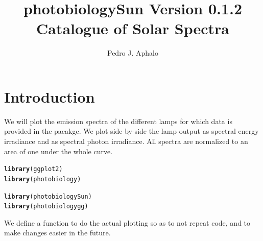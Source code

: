 \documentclass{article}\usepackage[]{graphicx}\usepackage[]{color}
\makeatletter
\newcommand{\hlstd}[1]{\textcolor[rgb]{0.345,0.345,0.345}{#1}}%
\newcommand{\hlkwd}[1]{\textcolor[rgb]{0.737,0.353,0.396}{\textbf{#1}}}%
\newenvironment{kframe}{%
 \def\at@end@of@kframe{}%
 \ifinner\ifhmode%
  \def\at@end@of@kframe{\end{minipage}}%
  \begin{minipage}{\columnwidth}%
 \fi\fi%
 \def\FrameCommand##1{\hskip\@totalleftmargin \hskip-\fboxsep
 \colorbox{shadecolor}{##1}\hskip-\fboxsep
     \hskip-\linewidth \hskip-\@totalleftmargin \hskip\columnwidth}%
 \MakeFramed {\advance\hsize-\width
   \@totalleftmargin\z@ \linewidth\hsize
   \@setminipage}}%
 {\par\unskip\endMakeFramed%
 \at@end@of@kframe}
\newenvironment{knitrout}{}{} %
\newcommand{\PBSun}{\textsf{photobiologySun}\xspace}
\makeatother
\begin{document}
\title{\PBSun Version 0.1.2\\ Catalogue of Solar Spectra}
\author{Pedro J. Aphalo}

\maketitle

\section{Introduction}

We will plot the emission spectra of the different lamps for which data is provided in the pacakge. We plot side-by-side the lamp output as spectral energy irradiance and as spectral photon irradiance. All spectra are normalized to an area of one under the whole curve.




\begin{knitrout}\footnotesize
{}\color{fgcolor}\begin{kframe}
\begin{alltt}
\hlkwd{library}\hlstd{(ggplot2)}
\hlkwd{library}\hlstd{(photobiology)}
\end{alltt}


{\ttfamily\noindent\itshape\color{messagecolor}{\#\# Loading required package: data.table}}\begin{alltt}
\hlkwd{library}\hlstd{(photobiologySun)}
\hlkwd{library}\hlstd{(photobiologygg)}
\end{alltt}


{\ttfamily\noindent\itshape\color{messagecolor}{\#\# Loading required package: proto\\\#\# Loading required package: splus2R\\\#\# Loading required package: plyr}}\end{kframe}
\end{knitrout}


We define a function to do the actual plotting so as to not repeat code, and to make changes easier in the future.
\end{document}
